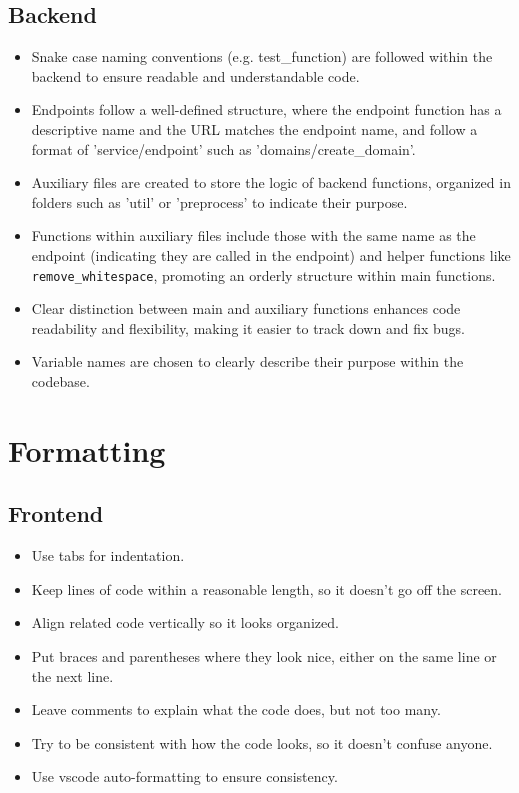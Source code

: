 \documentclass[12pt]{article}
\begin{document}
\subsection{Backend}
\begin{itemize}
    \item Snake case naming conventions (e.g. {test\_function}) are followed within the backend to ensure readable and understandable code.
    \item Endpoints follow a well-defined structure, where the endpoint function has a descriptive name and the URL matches the endpoint name, and follow a format of 'service/endpoint' such as {'domains/create\_domain'}.
    \item Auxiliary files are created to store the logic of backend functions, organized in folders such as 'util' or 'preprocess' to indicate their purpose.
    \item Functions within auxiliary files include those with the same name as the endpoint (indicating they are called in the endpoint) and helper functions like \texttt{remove\_whitespace}, promoting an orderly structure within main functions.
    \item Clear distinction between main and auxiliary functions enhances code readability and flexibility, making it easier to track down and fix bugs.
    \item Variable names are chosen to clearly describe their purpose within the codebase.
\end{itemize}

\newpage
\section{Formatting}
\subsection{Frontend}

\begin{itemize}
    \item Use tabs for indentation.
    \item Keep lines of code within a reasonable length, so it doesn't go off the screen.
    \item Align related code vertically so it looks organized.
    \item Put braces and parentheses where they look nice, either on the same line or the next line.
    \item Leave comments to explain what the code does, but not too many.
    \item Try to be consistent with how the code looks, so it doesn't confuse anyone.
    \item Use vscode auto-formatting to ensure consistency.
\end{itemize}
\end{document}

